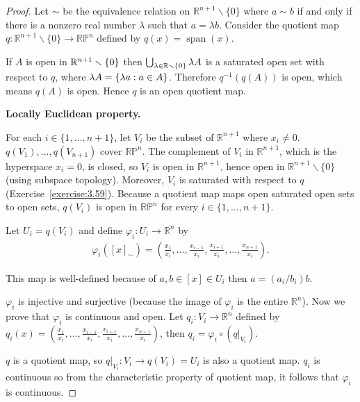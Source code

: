 \begin{proof}
    Let $\sim$ be the equivalence relation on $\mathbb{R}^{n+1}\smallsetminus\{0\}$ where $a\sim b$ if and only if there is a nonzero real number $\lambda$ such that $a = \lambda b$. Consider the quotient map $q: \mathbb{R}^{n+1}\smallsetminus\{0\} \to \mathbb{RP}^{n}$ defined by $q(x) = \operatorname{span}(x)$.

    If $A$ is open in $\mathbb{R}^{n+1}\smallsetminus\left\{{0}\right\}$ then $\bigcup_{\lambda\in\mathbb{R}\smallsetminus\left\{{0}\right\}}\lambda A$ is a saturated open set with respect to $q$, where $\lambda A = \left\{{ \lambda a : a\in A }\right\}$. Therefore $q^{-1}(q(A))$ is open, which means $q(A)$ is open. Hence $q$ is an open quotient map.

    \textbf{Locally Euclidean property.}

    For each $i\in \{ 1, \ldots, n+1 \}$, let $V_{i}$ be the subset of $\mathbb{R}^{n+1}$ where $x_{i} \ne 0$. $q(V_{1}), \ldots, q(V_{n+1})$ cover $\mathbb{RP}^{n}$. The complement of $V_{i}$ in $\mathbb{R}^{n+1}$, which is the hyperspace $x_{i} = 0$, is closed, so $V_{i}$ is open in $\mathbb{R}^{n+1}$, hence open in $\mathbb{R}^{n+1}\smallsetminus\{0\}$ (using subspace topology). Moreover, $V_{i}$ is saturated with respect to $q$ (Exercise~\ref{exercise:3.59}). Because a quotient map maps open saturated open sets to open sets, $q(V_{i})$ is open in $\mathbb{RP}^{n}$ for every $i\in \{ 1, \ldots, n+1 \}$.

    Let $U_{i} = q(V_{i})$ and define $\varphi_{i}: U_{i} \to \mathbb{R}^{n}$ by
    \begin{align*}
        \varphi_{i}({[x]}_{\sim}) = \left(\frac{x_{1}}{x_{i}}, \ldots, \frac{x_{i-1}}{x_{i}}, \frac{x_{i+1}}{x_{i}}, \ldots, \frac{x_{n+1}}{x_{i}}\right).
    \end{align*}

    This map is well-defined because of $a, b \in [x]\in U_{i}$ then $a = (a_{i}/b_{i})b$.

    $\varphi_{i}$ is injective and surjective (because the image of $\varphi_{i}$ is the entire $\mathbb{R}^{n}$). Now we prove that $\varphi_{i}$ is continuous and open. Let $q_{i}: V_{i} \to \mathbb{R}^{n}$ defined by $q_{i}(x) = \left(\frac{x_{1}}{x_{i}}, \ldots, \frac{x_{i-1}}{x_{i}}, \frac{x_{i+1}}{x_{i}}, \ldots, \frac{x_{n+1}}{x_{i}}\right)$, then $q_{i} = \varphi_{i}\circ (q\vert_{V_{i}})$.

    $q$ is a quotient map, so $q\vert_{V_{i}}: V_{i} \to q(V_{i}) = U_{i}$ is also a quotient map. $q_{i}$ is continuous so from the characteristic property of quotient map, it follows that $\varphi_{i}$ is continuous.


\end{proof}
